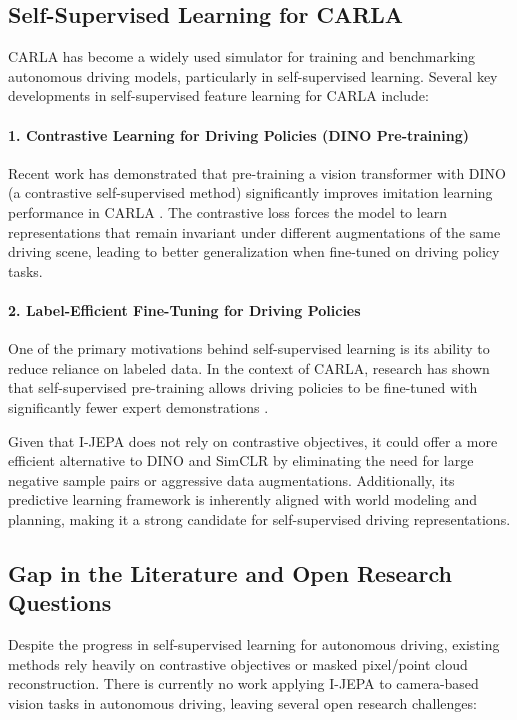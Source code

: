 \documentclass{article}
\begin{document}
\subsection{Self-Supervised Learning for CARLA}
CARLA has become a widely used simulator for training and benchmarking autonomous driving models, particularly in self-supervised learning. Several key developments in self-supervised feature learning for CARLA include:

\paragraph{1. Contrastive Learning for Driving Policies (DINO Pre-training)}
Recent work has demonstrated that pre-training a vision transformer with DINO (a contrastive self-supervised method) significantly improves imitation learning performance in CARLA \citep{carla_dino2024}. The contrastive loss forces the model to learn representations that remain invariant under different augmentations of the same driving scene, leading to better generalization when fine-tuned on driving policy tasks.

\paragraph{2. Label-Efficient Fine-Tuning for Driving Policies}
One of the primary motivations behind self-supervised learning is its ability to reduce reliance on labeled data. In the context of CARLA, research has shown that self-supervised pre-training allows driving policies to be fine-tuned with significantly fewer expert demonstrations \citep{carla_ssl2024}. 

Given that I-JEPA does not rely on contrastive objectives, it could offer a more efficient alternative to DINO and SimCLR by eliminating the need for large negative sample pairs or aggressive data augmentations. Additionally, its predictive learning framework is inherently aligned with world modeling and planning, making it a strong candidate for self-supervised driving representations.

\subsection{Gap in the Literature and Open Research Questions}
Despite the progress in self-supervised learning for autonomous driving, existing methods rely heavily on contrastive objectives or masked pixel/point cloud reconstruction. There is currently no work applying I-JEPA to camera-based vision tasks in autonomous driving, leaving several open research challenges:
\end{document}
